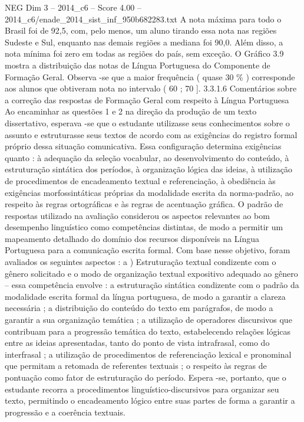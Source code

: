 \begin{textsample}{NEG Dim 3 – 2014\_c6 – Score 4.00 – 2014\_c6/enade\_2014\_sist\_inf\_950b682283.txt}
A nota máxima para todo o Brasil foi de 92,5, com, pelo menos, um aluno tirando essa nota nas regiões Sudeste e Sul, enquanto nas demais regiões a mediana foi 90,0.
Além disso, a nota mínima foi zero em todas as regiões do país, sem exceção.
O Gráfico 3.9 mostra a distribuição das notas de Língua Portuguesa do Componente de Formação Geral.
Observa -se que a maior frequência ( quase 30 \% ) corresponde aos alunos que obtiveram nota no intervalo ( 60 ; 70 ]. 3.3.1.6 Comentários sobre a correção das respostas de Formação Geral com respeito à Língua Portuguesa Ao encaminhar as questões 1 e 2 na direção da produção de um texto dissertativo, esperava -se que o estudante utilizasse seus conhecimentos sobre o assunto e estruturasse seus textos de acordo com as exigências do registro formal próprio dessa situação comunicativa.
Essa configuração determina exigências quanto : à adequação da seleção vocabular, ao desenvolvimento do conteúdo, à estruturação sintática dos períodos, à organização lógica das ideias, à utilização de procedimentos de encadeamento textual e referenciação, à obediência às exigências morfossintáticas próprias da modalidade escrita da norma-padrão, ao respeito às regras ortográficas e às regras de acentuação gráfica.
O padrão de respostas utilizado na avaliação considerou os aspectos relevantes ao bom desempenho linguístico como competências distintas, de modo a permitir um mapeamento detalhado do domínio dos recursos disponíveis na Língua Portuguesa para a comunicação escrita formal.
Com base nesse objetivo, foram avaliados os seguintes aspectos : a ) Estruturação textual condizente com o gênero solicitado e o modo de organização textual expositivo adequado ao gênero – essa competência envolve : a estruturação sintática condizente com o padrão da modalidade escrita formal da língua portuguesa, de modo a garantir a clareza necessária ; a distribuição do conteúdo do texto em parágrafos, de modo a garantir a sua organização temática ; a utilização de operadores discursivos que contribuam para a progressão temática do texto, estabelecendo relações lógicas entre as ideias apresentadas, tanto do ponto de vista intrafrasal, como do interfrasal ; a utilização de procedimentos de referenciação lexical e pronominal que permitam a retomada de referentes textuais ; o respeito às regras de pontuação como fator de estruturação do período.
Espera -se, portanto, que o estudante recorra a procedimentos linguístico-discursivos para organizar seu texto, permitindo o encadeamento lógico entre suas partes de forma a garantir a progressão e a coerência textuais.

\end{textsample}
